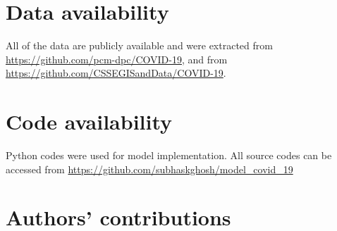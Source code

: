 \documentclass[fleqn,10pt]{wlscirep}
\begin{document}
\section*{Data availability}
All of the data are publicly available and were extracted from \url{https://github.com/pcm-dpc/COVID-19}, and from \url{https://github.com/CSSEGISandData/COVID-19}.

\section*{Code availability}
Python codes were used for model implementation. All source codes can be accessed from \url{https://github.com/subhaskghosh/model_covid_19}

\section*{Authors' contributions}
\label{SEC5}

	
\end{document}
